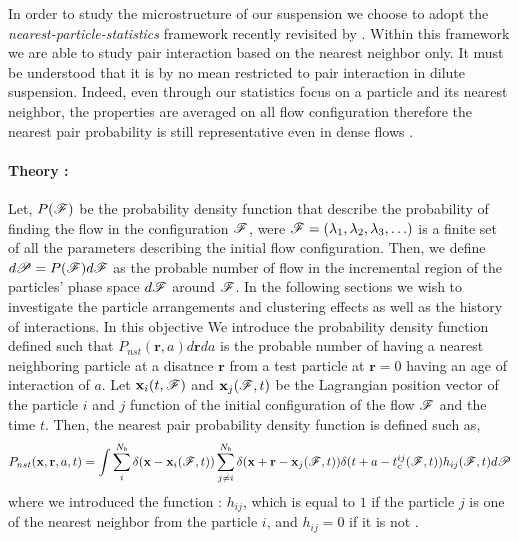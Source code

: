 
In order to study the microstructure of our suspension we choose to adopt the \textit{nearest-particle-statistics} framework recently revisited by \citet{zhang2021ensemble}.
Within this framework we are able to study pair interaction based on the nearest neighbor only. 
It must be understood that it is by no mean restricted to pair interaction in dilute suspension. 
Indeed, even through our statistics focus on a particle and its nearest neighbor, the properties are averaged on all flow configuration therefore the nearest pair probability is still representative even in dense flows \citet{zhang2021ensemble}. 


\paragraph*{Theory :}
Let, $P(\mathscr{F})$ be the probability density function that describe the probability of finding the flow in the configuration $\mathscr{F}$, were $\mathscr{F} = (\lambda_1,\lambda_2,\lambda_3,\ldots)$ is a finite set of all the parameters describing the initial flow configuration.
Then, we define $d\mathscr{P} = P(\mathscr{F})d\mathscr{F}$ as the probable number of flow in the incremental region of the particles' phase space $d\mathscr{F}$ around $\mathscr{F}$. 
In the following sections we wish to investigate the particle arrangements and clustering effects as well as the history of interactions. 
In this objective We introduce the probability density function defined such that $P_{nst}(\textbf{r},a)d\textbf{r}da$ is the probable number of having  a nearest neighboring particle at a disatnce $\textbf{r}$ from a test particle at $\textbf{r} = 0$ having an age of interaction of $a$. 
Let $\textbf{x}_i(t,\mathscr{F})$ and $\textbf{x}_j(\mathscr{F},t)$ be the Lagrangian position vector of the particle $i$ and $j$ function of the initial configuration of the flow $\mathscr{F}$ and the time $t$. 
Then, the nearest pair probability density function is defined such as, 
\begin{equation}
    P_{nst}(\textbf{x},\textbf{r},a,t)= 
    \int \sum_{i}^{N_b}\delta(\textbf{x}-\textbf{x}_i(\mathscr{F},t))
    \sum_{j\neq i}^{N_b}\delta(\textbf{x}+\textbf{r}-\textbf{x}_j(\mathscr{F},t)) 
    \delta(t+a-t_c^{ij}(\mathscr{F},t)) 
    h_{ij}(\mathscr{F},t) d\mathscr{P} 
    \label{eq:P_nstij}
\end{equation}
where we introduced the function : $h_{ij}$, which is equal to $1$ if the particle $j$ is one of the nearest neighbor from the particle $i$, and $h_{ij} = 0$ if it is not \citet{zhang2021ensemble}. 
